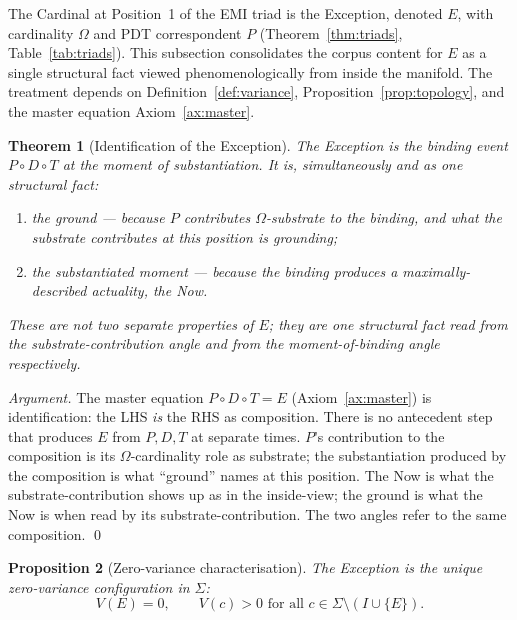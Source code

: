 \documentclass[11pt,a4paper]{article}
\newtheorem{theorem}{Theorem}[section]
\newtheorem{proposition}[theorem]{Proposition}
\theoremstyle{definition}
\theoremstyle{remark}
\begin{document}
The Cardinal at Position~1 of the EMI triad is the Exception, denoted $E$, with cardinality $\Omega$ and PDT correspondent $P$ (Theorem~\ref{thm:triads}, Table~\ref{tab:triads}). This subsection consolidates the corpus content for $E$ as a single structural fact viewed phenomenologically from inside the manifold. The treatment depends on Definition~\ref{def:variance}, Proposition~\ref{prop:topology}, and the master equation Axiom~\ref{ax:master}.

\begin{theorem}[Identification of the Exception]\label{thm:exception-identification}
The Exception is the binding event $P\circ D\circ T$ at the moment of substantiation. It is, simultaneously and as one structural fact:
\begin{enumerate}[label=(\roman*),leftmargin=*]
\item the \emph{ground} --- because $P$ contributes $\Omega$-substrate to the binding, and what the substrate contributes at this position is grounding;
\item the \emph{substantiated moment} --- because the binding produces a maximally-described actuality, the Now.
\end{enumerate}
These are not two separate properties of $E$; they are one structural fact read from the substrate-contribution angle and from the moment-of-binding angle respectively.
\end{theorem}

\begin{proof}[Argument]
The master equation $P \circ D \circ T = E$ (Axiom~\ref{ax:master}) is identification: the LHS \emph{is} the RHS as composition. There is no antecedent step that produces $E$ from $P,D,T$ at separate times. $P$'s contribution to the composition is its $\Omega$-cardinality role as substrate; the substantiation produced by the composition is what ``ground'' names at this position. The Now is what the substrate-contribution shows up as in the inside-view; the ground is what the Now is when read by its substrate-contribution. The two angles refer to the same composition. \qed
\end{proof}

\begin{proposition}[Zero-variance characterisation]\label{prop:E-zero-variance}
The Exception is the unique zero-variance configuration in $\Sigma$:
\[
V(E) = 0, \qquad V(c) > 0 \text{ for all } c \in \Sigma\setminus(I\cup\{E\}).
\]
\end{proposition}
\end{document}

